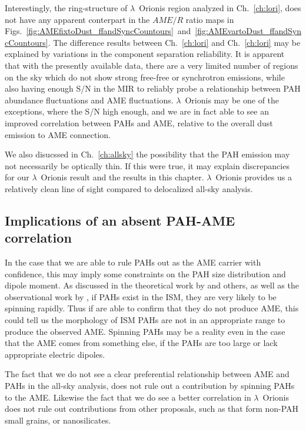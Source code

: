       Interestingly, the ring-structure of $\lambda$~Orionis region analyzed in Ch.~\ref{ch:lori}, does not have any apparent conterpart in the $AME/R$ ratio maps in Figs.~\ref{fig:AMEfixtoDust_ffandSyncCountours}~and~\ref{fig:AMEvartoDust_ffandSyncCountours}. The difference results between Ch.~\ref{ch:lori} and Ch.~\ref{ch:lori} may be explained by variations in the component separation reliability. It is apparent that with the presently available data, there are a very limited number of regions on the sky which do not show strong free-free or synchrotron emissions, while also having enough S/N in the MIR to reliably probe a relationship between PAH abundance fluctuations and AME fluctuations. $\lambda$~Orionis may be one of the exceptions, where the S/N high enough, and we are in fact able to see an improved correlation between PAHs and AME, relative to the overall dust emission to AME connection.

      We also disucssed in Ch.~\ref{ch:allsky} the possibility that the PAH emission may not necessarily be optically thin. If this were true, it may explain discrepancies for our $\lambda$~Orionis result and the results in this chapter. $\lambda$~Orionis provides us a relatively clean line of sight compared to delocalized all-sky analysis.

      \subsection{Implications of an absent PAH-AME correlation}
      In the case that we are able to rule PAHs out as the AME carrier with confidence, this may imply some constraints on the PAH size distribution and dipole moment. As discussed in the theoretical work by \cite{draine98a, ali-haimoud10} and others, as well as the observational work by \cite{hensley16}, if PAHs exist in the ISM, they are very likely to be spinning rapidly. Thus if are able to confirm that they do not produce AME, this could tell us the morphology of ISM PAHs are not in an appropriate range to produce the observed AME. Spinning PAHs may be a reality even in the case that the AME comes from something else, if the PAHs are too large or lack appropriate electric dipoles.

    The fact that we do not see a clear preferential relationship between AME and PAHs in the all-sky analysis, does not rule out a contribution by spinning PAHs to the AME. Likewise the fact that we do see a better correlation in $\lambda$~Orionis does not rule out contributions from other proposals, such as that form non-PAH small grains, or nanosilicates.


